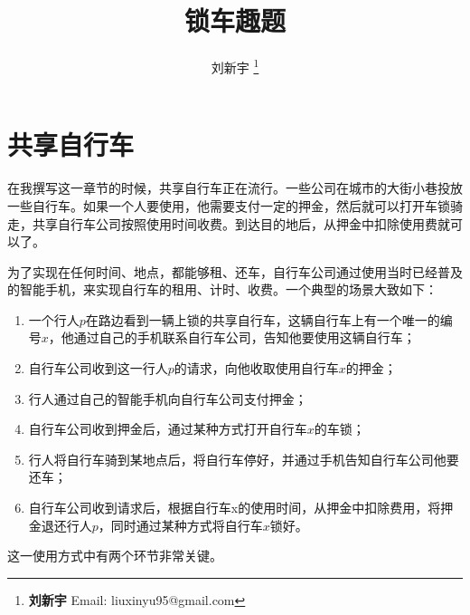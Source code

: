 \documentclass[UTF8]{article}
\begin{document}

\title{锁车趣题}

\author{刘新宇
\thanks{{\bfseries 刘新宇} \newline
  Email: liuxinyu95@gmail.com \newline}
  }

\maketitle
\fi


\section{共享自行车}

在我撰写这一章节的时候，共享自行车正在流行。一些公司在城市的大街小巷投放一些自行车。如果一个人要使用，他需要支付一定的押金，然后就可以打开车锁骑走，共享自行车公司按照使用时间收费。到达目的地后，从押金中扣除使用费就可以了。

为了实现在任何时间、地点，都能够租、还车，自行车公司通过使用当时已经普及的智能手机，来实现自行车的租用、计时、收费。一个典型的场景大致如下：

\begin{enumerate}
\item 一个行人$p$在路边看到一辆上锁的共享自行车，这辆自行车上有一个唯一的编号$x$，他通过自己的手机联系自行车公司，告知他要使用这辆自行车；
\item 自行车公司收到这一行人$p$的请求，向他收取使用自行车$x$的押金；
\item 行人通过自己的智能手机向自行车公司支付押金；
\item 自行车公司收到押金后，通过某种方式打开自行车$x$的车锁；
\item 行人将自行车骑到某地点后，将自行车停好，并通过手机告知自行车公司他要还车；
\item 自行车公司收到请求后，根据自行车x的使用时间，从押金中扣除费用，将押金退还行人$p$，同时通过某种方式将自行车$x$锁好。
\end{enumerate}

这一使用方式中有两个环节非常关键。

\end{document}
